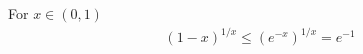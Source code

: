 %
%
%
%
%
%
%
%
%
%
%
%
%
%

\begin{lemma}
For $x\in (0,1)$
\begin{align*}
(1-x)^{1/x}\leq (e^{-x})^{1/x}=e^{-1}
\end{align*}
\label{lemma:exp}
\end{lemma}


